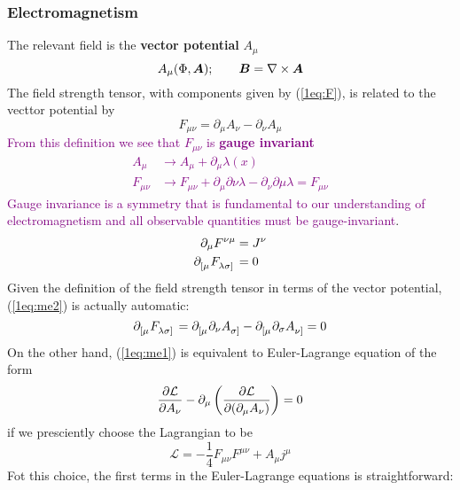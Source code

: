 \subsubsection{Electromagnetism}
The relevant field is the \textbf{vector potential} $A_\mu$
    \begin{equation*}
        A_\mu(\Phi,\vb*{A});\qquad \vb*{B}=\nabla\times\vb*{A}
    \end{equation*}
    The field strength tensor, with components given by (\ref{1eq:F}), is related to the vecttor potential by
    \begin{equation*}
        F_{\mu\nu}=\partial_\mu A_\nu-\partial_\nu A_\mu
    \end{equation*}
    \textcolor{purple}{From this definition we see that $F_{\mu\nu}$ is \textbf{gauge invariant}
    \begin{align*}
        A_\mu &\to A_\mu+\partial_\mu\lambda(x)\\
        F_{\mu\nu}&\to F_{\mu\nu}+\partial_\mu\partial\nu \lambda-\partial_\nu\partial\mu \lambda=F_{\mu\nu}
    \end{align*}
    Gauge invariance is a symmetry that is fundamental to our understanding of electromagnetism and all observable quantities must be gauge-invariant}.
    \begin{align}
       \label{1eq:me1}\partial_\mu F^{\nu\mu}&=J^\nu\\
        \label{1eq:me2}\tensor{\partial}{_{[\mu}}\tensor{F}{_{\lambda\sigma]}}&=0
    \end{align}
    Given the definition of the field strength tensor in terms of the vector potential, (\ref{1eq:me2}) is actually automatic:
    \begin{equation*}
        \tensor{\partial}{_{[\mu}}\tensor{F}{_{\lambda\sigma]}}=\tensor{\partial}{_{[\mu}}\partial_\nu\tensor{A}{_{\sigma]}}-\tensor{\partial}{_{[\mu}}\partial_\sigma\tensor{A}{_{\nu]}}=0
    \end{equation*}
    On the other hand, (\ref{1eq:me1}) is equivalent to Euler-Lagrange equation of the form
    \begin{equation*}
        \pdv{\mathcal{L}}{A_\nu}-\partial_\mu\left(\pdv{\mathcal{L}}{(\partial_\mu A_\nu)}\right)=0
    \end{equation*}
    if we presciently choose the Lagrangian to be
    \begin{equation*}
        \mathcal{L}=-\frac{1}{4}F_{\mu\nu}F^{\mu\nu}+A_\mu j^\mu
    \end{equation*}
    Fot this choice, the first terms in the Euler-Lagrange equations is straightforward:
